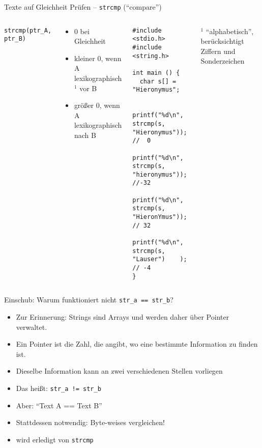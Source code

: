 \begin{frame}[fragile]{Texte auf Gleichheit Prüfen -- \texttt{strcmp} (\enquote{compare})}
%
\begin{columns}[T]
\begin{codebox}[Syntax]
\footnotesize\texttt{strcmp(ptr\_A, ptr\_B)}
\end{codebox}
%
\begin{tcolorbox}[title=Rückgabewerte]
\begin{itemize}
\item 0 bei Gleichheit
\item kleiner 0, wenn A lexikographisch${}^{1}$ vor B
\item größer 0, wenn A lexikographisch nach B
\end{itemize}
\end{tcolorbox}
%
\begin{codebox}[Beispiel]
\begin{verbatim}
#include <stdio.h>
#include <string.h>

int main () {
  char s[] = "Hieronymus";
  
  printf("%d\n", strcmp(s, "Hieronymus")); //  0
  printf("%d\n", strcmp(s, "hieronymus")); //-32
  printf("%d\n", strcmp(s, "HieronYmus")); // 32
  printf("%d\n", strcmp(s, "Lauser")    ); // -4
}
\end{verbatim}
\end{codebox}
\scriptsize ${}^{1}$ \enquote{alphabetisch}, berücksichtigt Ziffern und Sonderzeichen
%
\end{columns}
%
\end{frame}


\begin{frame}[fragile]{Einschub: Warum funktioniert nicht \texttt{str\_a == str\_b}?}
%
\begin{itemize}
\item Zur Erinnerung: Strings sind Arrays und werden daher über Pointer verwaltet.
\item Ein Pointer ist die Zahl, die angibt, wo eine bestimmte Information zu finden ist.
\item Dieselbe Information kann an zwei verschiedenen Stellen vorliegen
\item Das heißt: \texttt{str\_a != str\_b}
\item Aber: \enquote{Text A == Text B}
\item Stattdessen notwendig: Byte-weises vergleichen!
\item[\Thus] wird erledigt von \texttt{strcmp}
\end{itemize}
%
\end{frame}

